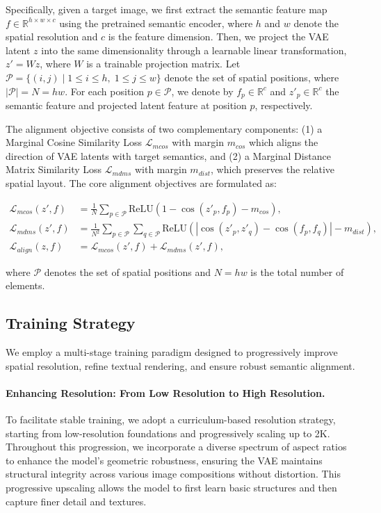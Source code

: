 Specifically, given a target image, we first extract the semantic feature map $f \in \mathbb{R}^{h \times w \times c}$ using the pretrained semantic encoder, where $h$ and $w$ denote the spatial resolution and $c$ is the feature dimension. Then, we project the VAE latent $z$ into the same dimensionality through a learnable linear transformation, $z' = Wz$, where $W$ is a trainable projection matrix. Let $\mathcal{P} = \{(i,j) \mid 1 \le i \le h,\; 1 \le j \le w\}$ denote the set of spatial positions, where $|\mathcal{P}| = N = hw$. For each position $p \in \mathcal{P}$, we denote by $f_p \in \mathbb{R}^{c}$ and $z'_p \in \mathbb{R}^{c}$ the semantic feature and projected latent feature at position $p$, respectively.

The alignment objective consists of two complementary components: (1) a Marginal Cosine Similarity Loss $\mathcal{L}_{mcos}$ with margin $m_{cos}$ which aligns the direction of VAE latents with target semantics, and (2) a Marginal Distance Matrix Similarity Loss $\mathcal{L}_{mdms}$ with margin $m_{dist}$, which preserves the relative spatial layout. The core alignment objectives are formulated as:

\begin{align}
\mathcal{L}_{mcos}(z', f)
&= \frac{1}{N} \sum_{p \in \mathcal{P}} \mathrm{ReLU} \left( 1 - \cos(z'_p, f_p) - m_{cos}\right), \\
\mathcal{L}_{mdms}(z', f)
&= \frac{1}{N^2} \sum_{p \in \mathcal{P}} \sum_{q \in \mathcal{P}} \mathrm{ReLU} \left( \left| \cos(z'_p, z'_q) - \cos(f_p, f_q) \right| - m_{dist} \right), \\
\mathcal{L}_{align}(z, f)
&= \mathcal{L}_{mcos}(z', f) + \mathcal{L}_{mdms}(z', f),
\end{align}

where $\mathcal{P}$ denotes the set of spatial positions and $N=hw$ is the total number of elements.



\subsection{Training Strategy}
We employ a multi-stage training paradigm designed to progressively improve spatial resolution, refine textual rendering, and ensure robust semantic alignment. 


\paragraph{Enhancing Resolution: From Low Resolution to High Resolution.} 
To facilitate stable training, we adopt a curriculum-based resolution strategy, starting from low-resolution foundations and progressively scaling up to 2K. Throughout this progression, we incorporate a diverse spectrum of aspect ratios to enhance the model's geometric robustness, ensuring the VAE maintains structural integrity across various image compositions without distortion. This progressive upscaling allows the model to first learn basic structures and then capture finer detail and textures.


